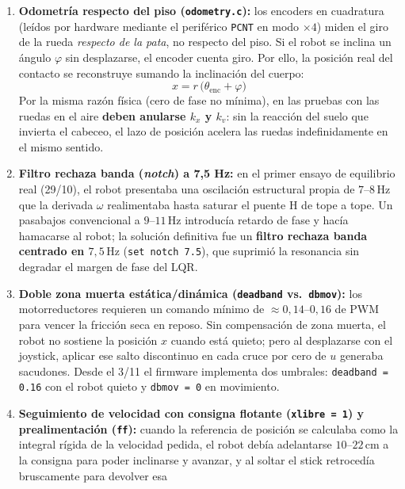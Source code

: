 \documentclass[11pt,a4paper]{report}
\newcommand{\ud}[1]{\,\mathrm{#1}}
\begin{document}
\begin{enumerate}[leftmargin=1.6em]
\item \textbf{Odometría respecto del piso (\texttt{odometry.c}):} los encoders en cuadratura
      (leídos por hardware mediante el periférico \texttt{PCNT} en modo $\times 4$) miden el
      giro de la rueda \emph{respecto de la pata}, no respecto del piso. Si el robot se inclina
      un ángulo $\varphi$ sin desplazarse, el encoder cuenta giro. Por ello, la posición real
      del contacto se reconstruye sumando la inclinación del cuerpo:
      \[
      x = r\,\bigl(\theta_{\text{enc}} + \varphi\bigr)
      \]
      Por la misma razón física (cero de fase no mínima), en las pruebas con las ruedas en el
      aire \textbf{deben anularse $k_x$ y $k_v$}: sin la reacción del suelo que invierta el
      cabeceo, el lazo de posición acelera las ruedas indefinidamente en el mismo sentido.
\item \textbf{Filtro rechaza banda (\emph{notch}) a 7,5 Hz:} en el primer ensayo de equilibrio
      real (29/10), el robot presentaba una oscilación estructural propia de $7\text{--}8\ud{Hz}$
      que la derivada $\omega$ realimentaba hasta saturar el puente H de tope a tope. Un
      pasabajos convencional a $9\text{--}11\ud{Hz}$ introducía retardo de fase y hacía
      hamacarse al robot; la solución definitiva fue un \textbf{filtro rechaza banda centrado en
      $7{,}5\ud{Hz}$} (\texttt{set notch 7.5}), que suprimió la resonancia sin degradar el
      margen de fase del LQR.
\item \textbf{Doble zona muerta estática/dinámica (\texttt{deadband} vs.\ \texttt{dbmov}):} los
      motorreductores requieren un comando mínimo de $\approx 0{,}14\text{--}0{,}16$ de PWM
      para vencer la fricción seca en reposo. Sin compensación de zona muerta, el robot no
      sostiene la posición $x$ cuando está quieto; pero al desplazarse con el joystick, aplicar
      ese salto discontinuo en cada cruce por cero de $u$ generaba sacudones. Desde el 3/11 el
      firmware implementa dos umbrales: \texttt{deadband = 0.16} con el robot quieto y
      \texttt{dbmov = 0} en movimiento.
\item \textbf{Seguimiento de velocidad con consigna flotante (\texttt{xlibre = 1}) y prealimentación (\texttt{ff}):}
      cuando la referencia de posición se calculaba como la integral rígida de la velocidad
      pedida, el robot debía adelantarse $10\text{--}22\ud{cm}$ a la consigna para poder
      inclinarse y avanzar, y al soltar el stick retrocedía bruscamente para devolver esa

\end{enumerate}
\end{document}
